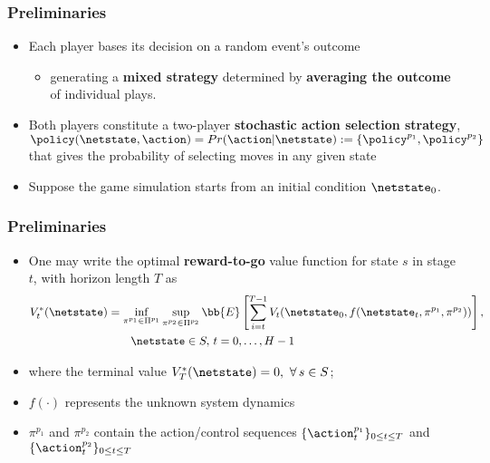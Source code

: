 \begin{frame}
	\frametitle{Preliminaries}
	\begin{itemize}
		\item Each player bases its decision on a random event's outcome 
		\begin{itemize}
			\item  generating a \textbf{mixed strategy} determined by \textbf{averaging the outcome} of individual plays.
		\end{itemize}
	\item Both players constitute a two-player \textbf{stochastic action selection strategy}, $\policy(\netstate, \action) = Pr(\action | \netstate):=\{\policy^{p_1}, \policy^{p_2}\}$ that gives the probability of selecting moves in any given state
	\item Suppose the game simulation starts from an initial condition $\netstate_0$.
	\end{itemize}
\end{frame}

\begin{frame}
\frametitle{Preliminaries}
%
\begin{itemize}
	\item One may write the optimal \textbf{reward-to-go} value function for state $s$ in stage $t$, with horizon length $T$ as 
	\begin{align}
	V_t^*(\netstate) & = \inf_{\pi^{p_1} \in \Pi^{p_1}} \sup_{\pi^{p_2} \in \Pi^{p_2}} \bb{E}\left[\sum_{i=t}^{T-1} V_t(\netstate_0, f(\netstate_t, \pi^{p_1}, \pi^{p_2})) \right], \nonumber \\
	&	\qquad  \netstate \in S, \, t = 0, \ldots, H-1 \nonumber
	\end{align}
	\item where the terminal value $V_T^*(\netstate) = 0, \, \, \forall \, s \in S$;
	\item $f(\cdot)$ represents the unknown system dynamics
	\item $\pi^{p_1}$ and $\pi^{p_2}$ contain the action/control sequences $\{\action^{p_1}_t\}_{0 \le t \le T}$ and $\{\action^{p_2}_t\}_{0 \le t \le T}$
\end{itemize} 
%
\end{frame}

